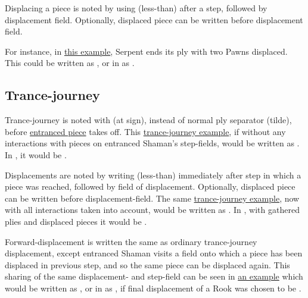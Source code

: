 Displacing a piece is noted by using \alg{<} (less-than) after a step, followed by
displacement field. Optionally, displaced piece can be written before displacement
field.

For instance, in \hyperref[fig:scn_tr_19_displacement_init]{this example}, Serpent ends
its ply with two Pawns displaced. This could be written as ,
or in  as\newline
{}.

\subsection*{Trance-journey}
\label{sec:Appendix/Notation/Trance-journey}

Trance-journey is noted with  (at sign), instead of normal ply separator
\alg{\textasciitilde{}} (tilde), before
\hyperref[fig:scn_cot_072_entrancement_step]{entranced piece} takes off. This
\hyperref[fig:scn_cot_086_light_light_shaman_interaction_start]{trance-journey example},
if without any interactions with pieces on entranced Shaman's step-fields, would be
written as . In , it would be .

Displacements are noted by writing \alg{<} (less-than) immediately after step in
which a piece was reached, followed by field of displacement. Optionally, displaced
piece can be written before displacement-field. The same
\hyperref[fig:scn_cot_087_light_light_shaman_interaction_end]{trance-journey example},
now with all interactions taken into account, would be written as
.
In , with gathered plies and displaced pieces it would be\newline
{}.

Forward-displacement is written the same as ordinary trance-journey displacement,
except entranced Shaman visits a field onto which a piece has been displaced in
previous step, and so the same piece can be displaced again. This sharing of the
same displacement- and step-field can be seen in
\hyperref[fig:scn_cot_098_forward_displacement_start]{an example} which would be
written as , or in  as\newline
{}, if final displacement of
a Rook was chosen to be .

